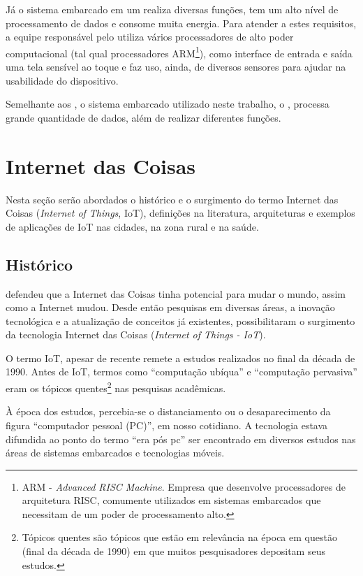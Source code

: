 Já o sistema embarcado em um \smartphone[] realiza diversas funções, tem um
alto nível de processamento de dados e consome muita energia. Para atender a
estes requisitos, a equipe responsável pelo \design[] utiliza vários
processadores de alto poder computacional (tal qual processadores
ARM\footnote{ARM - \textit{Advanced RISC Machine}. Empresa que desenvolve 
processadores de arquitetura RISC, comumente utilizados em sistemas
embarcados que necessitam de um poder de processamento alto.}), como interface
de entrada e saída uma tela sensível ao toque e faz uso, ainda, de diversos
sensores para ajudar na usabilidade do dispositivo.

Semelhante aos \smartphones, o sistema embarcado utilizado neste trabalho, o
\stb[], processa grande quantidade de dados, além de realizar diferentes funções. 

\section{Internet das Coisas} \label{sec:iot}

Nesta seção serão abordados o histórico e o surgimento do termo
Internet das Coisas (\textit{Internet of Things}, IoT), definições
na literatura, arquiteturas e exemplos de aplicações de IoT nas cidades,
na zona rural e na saúde.

\subsection{Histórico} \label{subsec:iot-historico}

 defendeu que a Internet
das Coisas tinha potencial para mudar o mundo, assim como a Internet mudou.
Desde então pesquisas em diversas áreas, a inovação tecnológica e a atualização
de conceitos já existentes, possibilitaram o surgimento da tecnologia Internet das
Coisas (\textit{Internet of Things - IoT}).

O termo IoT, apesar de recente remete a estudos realizados no final da década
de 1990. Antes de IoT, termos como ``computação ubíqua'' e ``computação pervasiva''
eram os tópicos quentes\footnote{Tópicos quentes são tópicos que estão em relevância
na época em questão (final da década de 1990) em que muitos pesquisadores depositam seus 
estudos.} nas pesquisas acadêmicas.

À época dos estudos, percebia-se o distanciamento ou o desaparecimento da
figura ``computador pessoal (PC)'', em nosso cotidiano. A tecnologia estava
difundida ao ponto do termo  ``era pós pc'' ser encontrado em diversos estudos
\cite{bonilla2011inclusao,  chen2011pospc, press1999personal} nas áreas de
sistemas embarcados e tecnologias móveis.

